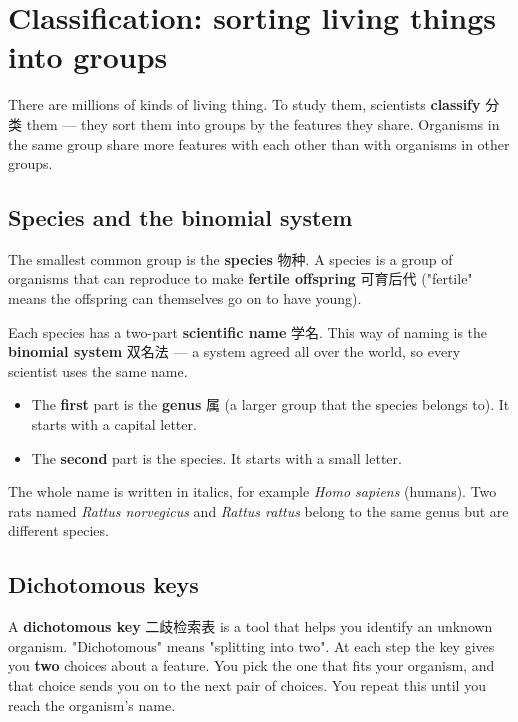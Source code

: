 \documentclass[11pt]{article}
\begin{document}
\section*{Classification: sorting living things into groups}

There are millions of kinds of living thing. To study them, scientists \textbf{classify} 分类 them — they sort them into groups by the features they share. Organisms in the same group share more features with each other than with organisms in other groups.

\subsection*{Species and the binomial system}

The smallest common group is the \textbf{species} 物种. A species is a group of organisms that can reproduce to make \textbf{fertile offspring} 可育后代 ("fertile" means the offspring can themselves go on to have young).

Each species has a two-part \textbf{scientific name} 学名. This way of naming is the \textbf{binomial system} 双名法 — a system agreed all over the world, so every scientist uses the same name.

\begin{itemize}
\item The \textbf{first} part is the \textbf{genus} 属 (a larger group that the species belongs to). It starts with a capital letter.

\item The \textbf{second} part is the species. It starts with a small letter.

\end{itemize}

The whole name is written in italics, for example \emph{Homo sapiens} (humans). Two rats named \emph{Rattus norvegicus} and \emph{Rattus rattus} belong to the same genus but are different species.

\subsection*{Dichotomous keys}

A \textbf{dichotomous key} 二歧检索表 is a tool that helps you identify an unknown organism. "Dichotomous" means "splitting into two". At each step the key gives you \textbf{two} choices about a feature. You pick the one that fits your organism, and that choice sends you on to the next pair of choices. You repeat this until you reach the organism's name.
\end{document}

